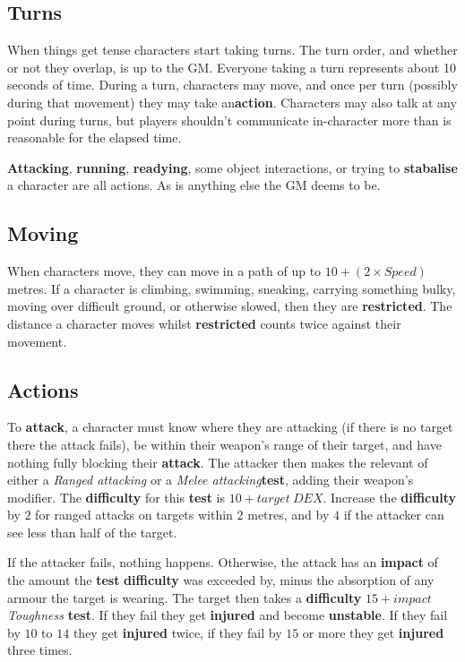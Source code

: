 \documentclass[11pt]{article}
\begin{document}
\begin{multicols}{3}
  \subsection*{Turns}

  When things get tense characters start taking turns. The turn order, and whether or not they overlap, is up to the GM. Everyone taking a turn represents about 10 seconds of time. During a turn, characters may move, and once per turn (possibly during that movement) they may take an ​\textbf{action​}. Characters may also talk at any point during turns, but players shouldn't communicate in-character more than is reasonable for the elapsed time.
  
  \textbf{Attacking}, \textbf{running}, \textbf{readying}, some object interactions, or trying to \textbf{stabalise} a character are all actions. As is anything else the GM deems to be.
  

  \subsection*{Moving}

  When characters move, they can move in a path of up to $10 + (2 \times Speed)$ metres. If a character is climbing, swimming, sneaking, carrying something bulky, moving over difficult ground, or otherwise slowed, then they are \textbf{restricted}. The distance a character moves whilst \textbf{restricted} counts twice against their movement.

  \subsection*{Actions}

  To \textbf{attack}, a character must know where they are attacking (if there is no target there the attack fails), be within their weapon's range of their target, and have nothing fully blocking their \textbf{attack}. The attacker then makes the relevant of either a \textit{​Ranged attacking​} or a \textit{​Melee attacking​​}  \textbf{test​}, adding their weapon's modifier. The \textbf{difficulty} for this ​\textbf{test​} is $10 + target\:DEX$. Increase the \textbf{difficulty} by $2$ for ranged attacks on targets within $2$ metres, and by $4$ if the attacker can see less than half of the target.

  If the attacker fails, nothing happens. Otherwise, the attack has an \textbf{impact} of the amount the \textbf{test} \textbf{difficulty} was exceeded by, minus the absorption of any armour the target is wearing. The target then takes a \textbf{difficulty} $15 + impact$ \textit{Toughness} \textbf{test}. If they fail they get \textbf{injured} and become \textbf{unstable}. If they fail by $10$ to $14$ they get \textbf{injured} twice, if they fail by $15$ or more they get \textbf{injured} three times.


\end{multicols}
\end{document}
